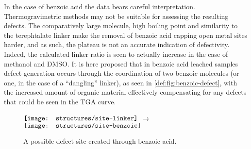 In the case of benzoic acid the data bears careful interpretation. 
Thermogravimetric methods may not be suitable 
for assessing the resulting defects. The comparatively large molecule,
high boiling point and similarity to the terephtalate linker
make the removal of benzoic acid capping open metal sites harder, and
as such, the plateau is not an accurate indication of defectivity.
Indeed, the calculated linker ratio is seen to actually increase in 
the case of methanol and \gls{DMSO}. It is here proposed that in benzoic acid 
leached samples defect generation occurs through the coordination
of two benzoic molecules (or one, in the case of a ``dangling'' linker), 
as seen in \autoref{def:fig:benzoic-defect},
with the increased amount of organic material effectively compensating
for any defects that could be seen in the \gls{TGA} curve.

\begin{figure}[htb]
    \centering
    \( \vcenter{\hbox{\texttt{[image: structures/site-linker]}}}\)%
    \( \longrightarrow \)%
    \(\vcenter{\hbox{\texttt{[image: structures/site-benzoic]}}}\)
		\caption{A possible defect site created through benzoic acid.
		}\label{def:fig:benzoic-defect}
\end{figure}


